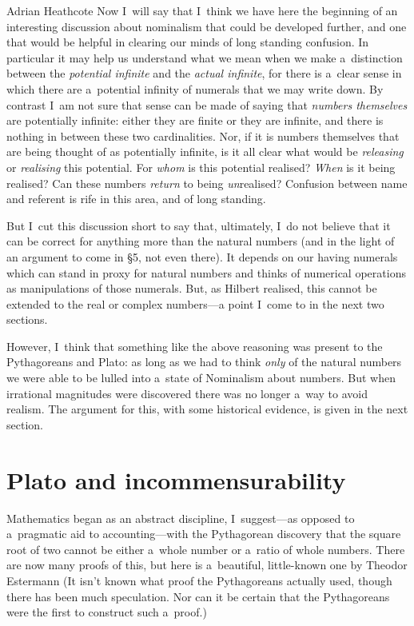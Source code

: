 \begin{artengenv}{Adrian Heathcote}
Now I~will say that I~think we have here the beginning of an interesting discussion about nominalism that could be developed further, and one that would be helpful in clearing our minds of long standing confusion. In particular it may help us understand what we mean when we make a~distinction between the \textit{potential infinite} and the \textit{actual infinite}, for there is a~clear sense in which there are a~potential infinity of numerals that we may write down. By contrast I~am not sure that sense can be made of saying that \textit{numbers themselves} are potentially infinite: either they are finite or they are infinite, and there is nothing in between these two cardinalities. Nor, if it is numbers themselves that are being thought of as potentially infinite, is it all clear what would be \textit{releasing} or \textit{realising} this potential. For \textit{whom} is this potential realised? \textit{When} is it being realised? Can these numbers \textit{return} to being \textit{un}realised? Confusion between name and referent is rife in this area, and of long standing.

But I~cut this discussion short to say that, ultimately, I~do not believe that it can be correct for anything more than the natural numbers (and in the light of an argument to come in \S 5, not even there). It depends on our having numerals which can stand in proxy for natural numbers and thinks of numerical operations as manipulations of those numerals. But, as Hilbert realised, this cannot be extended to the real or complex numbers---a point I~come to in the next two sections.

However, I~think that something like the above reasoning was present to the Pythagoreans and Plato: as long as we had to think \textit{only} of the natural numbers we were able to be lulled into a~state of Nominalism about numbers. But when irrational magnitudes were discovered there was no longer a~way to avoid realism. The argument for this, with some historical evidence, is given in the next section.




\section{Plato and incommensurability}

Mathematics began as an abstract discipline, I~suggest---as opposed to a~pragmatic aid to accounting---with the Pythagorean discovery that the square root of two cannot be either a~whole number or a~ratio of whole numbers. There are now many proofs of this, but here is a~beautiful, little-known one by Theodor Estermann \parencite*{estermann_irrationality_1975}%
 (It isn't known what proof the Pythagoreans actually used, though there has been much speculation. Nor can it be certain that the Pythagoreans were the first to construct such a~proof.) 


\end{artengenv}
